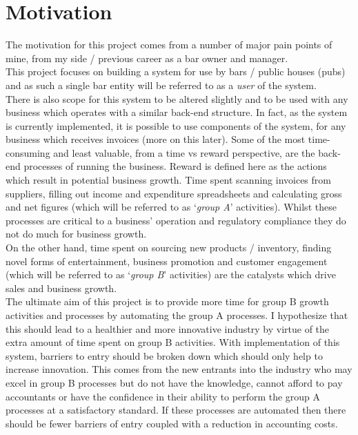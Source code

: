 \section{Motivation}
The motivation for this project comes from a number of major pain points of mine, from my side / previous career as a bar owner and manager. \\ This project focuses on building a system for use by
bars / public houses (pubs) and as such a single bar entity will be referred to as a \emph{user} of the system.\\
There is also scope for this system to be altered slightly and to be used with any business which operates with a similar back-end structure.
In fact, as the system is currently implemented, it is possible to use components of the system, for any business
which receives invoices (more on this later).
\bigbreak
Some of the most time-consuming and least valuable, from a time vs reward perspective, are the back-end processes of running the business. Reward is defined here as the actions which result
in potential business growth. Time spent scanning invoices from suppliers, filling out income and expenditure spreadsheets and calculating gross and net figures (which will be referred to
as `\emph{group A}' activities). Whilst these processes are critical to a business' operation and regulatory compliance they do not do much for business growth.\\
On the other hand, time spent on sourcing new products / inventory, finding novel forms of entertainment, business promotion and customer engagement (which will be referred to as
`\emph{group B}' activities) are the catalysts which drive sales and business growth.\\
The ultimate aim of this project is to provide more time for group B growth activities and processes by automating the group A processes.
\bigbreak
I hypothesize that this should lead to a healthier and more innovative industry by virtue of the extra amount of time spent on group B activities. With implementation of this system,
barriers to entry should be broken down which should only help to increase innovation. This comes from the new entrants into the industry who may excel in group B processes but do not have
the knowledge, cannot afford to pay accountants or have the confidence in their ability to perform the group A processes at a satisfactory standard. If these processes are automated then
there should be fewer barriers of entry coupled with a reduction in accounting costs. \\
